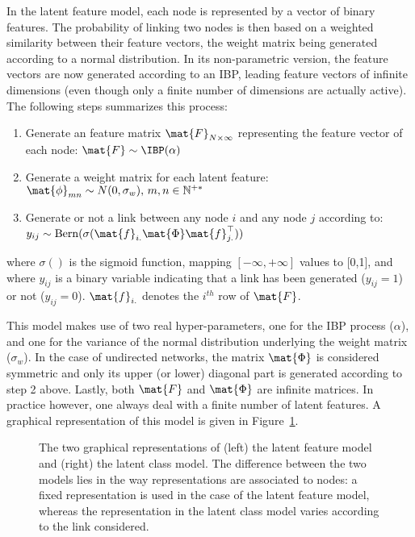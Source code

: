 In the latent feature model, each node is represented by a vector of binary features. The probability of linking two nodes is then based on a weighted similarity between their feature vectors, the weight matrix being generated according to a normal distribution. In its non-parametric version, the feature vectors are now generated according to an IBP, leading feature vectors of infinite dimensions (even though only a finite number of dimensions are actually active). The following steps summarizes this process:
%
\begin{enumerate}
\item Generate an feature matrix $\mat{F}_{N \times \infty}$ representing the feature vector of each node: $\mat{F} \sim \IBP(\alpha)$
\item Generate a weight matrix for each latent feature:\\
 $\mat{\phi}_{mn} \sim N(0, \sigma_w), \, m,n \in \mathbb{N}^{+*}$
\item Generate or not a link between any node $i$ and any node $j$ according to: 	$y_{ij} \sim \mathrm{Bern}(\sigma(\mat{f}_{i.} \mat{\Phi} \mat{f}_{j.}^\top))$
\end{enumerate}
%
where $\sigma()$ is the sigmoid function, mapping $[-\infty, +\infty]$ values to [0,1], and where $y_{ij}$ is a binary variable indicating that a link has been generated ($y_{ij}=1$) or not ($y_{ij}=0$). $\mat{f}_{i.}$ denotes the $i^{th}$ row of $\mat{F}$.

This model makes use of two real hyper-parameters, one for the IBP process ($\alpha$), and one for the variance of the normal distribution underlying the weight matrix ($\sigma_w$). In the case of undirected networks, the matrix $\mat{\Phi}$ is considered symmetric and only its upper (or lower) diagonal part is generated according to step 2 above. Lastly, both $\mat{F}$ and $\mat{\Phi}$ are infinite matrices. In practice however, one always deal with a finite number of latent features. A graphical representation of this model is given in Figure~\ref{fig:ilfrm}.

\begin{figure}[t]
	\centering
	\scalebox{0.88}{
	}
	\endminipage
	\scalebox{0.88}{
		}
	\endminipage
	\caption{The two graphical representations of (left) the latent feature model and (right) the latent class model. The difference between the two models lies in the way representations are associated to nodes: a fixed representation is used in the case of the latent feature model, whereas the representation in the latent class model varies according to the link considered.}
	\label{fig:ilfrm}
\end{figure}

